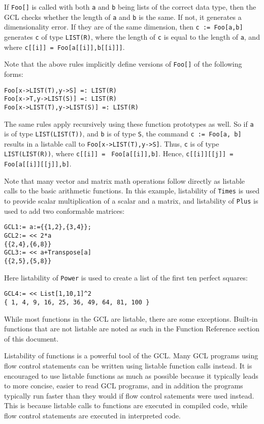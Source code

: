 If \verb+Foo[]+ is called with both \verb+a+ and \verb+b+ being lists
of the correct data type, then the GCL checks whether the length of
\verb+a+ and \verb+b+ is the same.  If not, it generates a
dimensionality error. If they are of the same dimension, then 
\verb+c := Foo[a,b]+ generates \verb+c+ of type \verb+LIST(R)+, where the
length of \verb+c+ is equal to the length of \verb+a+, and where
\verb+c[[i]] = Foo[a[[i]],b[[i]]]+.

Note that the above rules implicitly define versions of \verb+Foo[]+
of the following forms:

\begin{verbatim}
Foo[x->LIST(T),y->S] =: LIST(R)
Foo[x->T,y->LIST(S)] =: LIST(R)
Foo[x->LIST(T),y->LIST(S)] =: LIST(R)
\end{verbatim}

The same rules apply recursively using these function prototypes as
well.  So if \verb+a+ is of type \verb+LIST(LIST(T))+, and \verb+b+ is
of type \verb+S+, the command \verb+c := Foo[a, b]+ results in a
listable call to \verb+Foo[x->LIST(T),y->S]+.  Thus, \verb+c+ is of
type \verb+LIST(LIST(R))+, where \verb+c[[i]] = +
\verb+Foo[a[[i]],b]+.  Hence, \verb+c[[i]][[j]] = +
\verb+Foo[a[[i]][[j]],b]+.

Note that many vector and matrix math operations follow directly as
listable calls to the basic arithmetic functions.  In this example,
listability of \verb+Times+ is used to provide scalar multiplication
of a scalar and a matrix, and listability of \verb+Plus+ is used to
add two conformable matrices:  

\begin{verbatim}
GCL1:= a:={{1,2},{3,4}};
GCL2:= << 2*a
{{2,4},{6,8}}
GCL3:= << a+Transpose[a]
{{2,5},{5,8}}
\end{verbatim}

Here listability of \verb+Power+ is used to create a list of the first
ten perfect squares:

\begin{verbatim}
GCL4:= << List[1,10,1]^2
{ 1, 4, 9, 16, 25, 36, 49, 64, 81, 100 }
\end{verbatim}

While most functions in the GCL are listable, there are some
exceptions.  Built-in functions that are not listable are noted as
such in the Function Reference section of this document.

Listability of functions is a powerful tool of the GCL. Many GCL
programs using flow control statements can be written using listable
function calls instead.  It is encouraged to use listable functions as
much as possible because it typically leads to more concise, easier to
read GCL programs, and in addition the programs typically run
faster than they would if flow control satements were used instead.
This is because listable calls to functions are executed in compiled
code, while flow control statements are executed in interpreted code.

